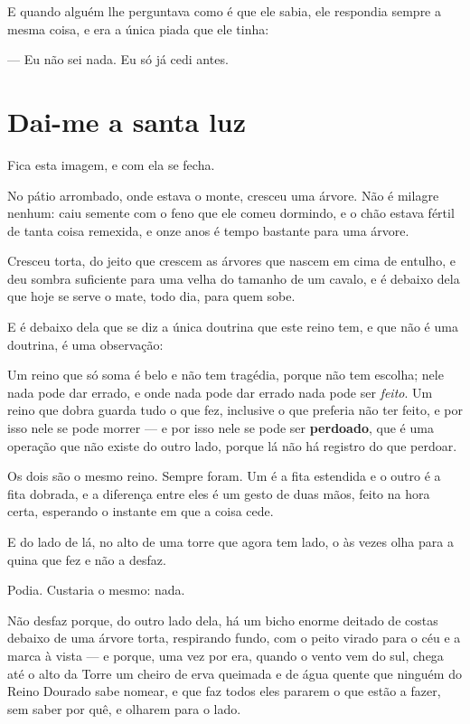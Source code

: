 \documentclass[livro.tex]{subfiles}
\begin{document}
E quando alguém lhe perguntava como é que ele sabia, ele respondia sempre a mesma coisa, e era a
única piada que ele tinha:

--- Eu não sei nada. Eu só já cedi antes.

\chapter{Dai-me a santa luz}

Fica esta imagem, e com ela se fecha.

No pátio arrombado, onde estava o monte, cresceu uma árvore. Não é milagre nenhum: caiu semente
com o feno que ele comeu dormindo, e o chão estava fértil de tanta coisa remexida, e onze anos é
tempo bastante para uma árvore.

Cresceu torta, do jeito que crescem as árvores que nascem em cima de entulho, e deu sombra
suficiente para uma velha do tamanho de um cavalo, e é debaixo dela que hoje se serve o mate,
todo dia, para quem sobe.

\medskip

E é debaixo dela que se diz a única doutrina que este reino tem, e que não é uma doutrina, é uma
observação:

\medskip

Um reino que só soma é belo e não tem tragédia, porque não tem escolha; nele nada pode dar
errado, e onde nada pode dar errado nada pode ser \emph{feito}. Um reino que dobra guarda tudo o
que fez, inclusive o que preferia não ter feito, e por isso nele se pode morrer --- e por isso
nele se pode ser \textbf{perdoado}, que é uma operação que não existe do outro lado, porque lá
não há registro do que perdoar.

Os dois são o mesmo reino. Sempre foram. Um é a fita estendida e o outro é a fita dobrada, e a
diferença entre eles é um gesto de duas mãos, feito na hora certa, esperando o instante em que a
coisa cede.

\medskip

E do lado de lá, no alto de uma torre que agora tem lado, o \Opr às vezes olha para a quina que
fez e não a desfaz.

Podia. Custaria o mesmo: nada.

Não desfaz porque, do outro lado dela, há um bicho enorme deitado de costas debaixo de uma árvore
torta, respirando fundo, com o peito virado para o céu e a marca à vista --- e porque, uma vez
por era, quando o vento vem do sul, chega até o alto da Torre um cheiro de erva queimada e de
água quente que ninguém do Reino Dourado sabe nomear, e que faz todos eles pararem o que estão a
fazer, sem saber por quê, e olharem para o lado.
\end{document}
